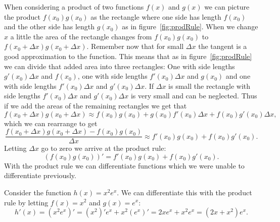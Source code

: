 \documentclass[main.tex]{subfiles}
\begin{document}
When considering a product of two functions $f(x)$ and $g(x)$ we can picture the product $f(x_0) g(x_0)$ as the rectangle where one side has length $f(x_0)$ and the other side has length $g(x_0)$ as in figure~\ref{fig:prodRule}. When we change $x$ a little the area of the rectangle changes from $f(x_0) g(x_0)$ to $f(x_0 + \Delta x) g(x_0 + \Delta x)$. Remember now that for small $\Delta x$ the tangent is a good approximation to the function. This means that as in figure~\ref{fig:prodRule} we can divide that added area into three rectangles: One with side lengths $g'(x_0) \Delta x$ and $f(x_0)$, one with side lengths $f'(x_0) \Delta x$ and $g(x_0)$ and one with side lengths $f'(x_0) \Delta x$ and $g'(x_0) \Delta x$. If $\Delta x$ is small the rectangle with side lengths $f'(x_0) \Delta x$ and $g'(x_0) \Delta x$ is very small and can be neglected. Thus if we add the areas of the remaining rectangles we get that
\begin{equation}
f(x_0 + \Delta x) g(x_0 + \Delta x) \approx f(x_0) g(x_0) + g(x_0) f'(x_0) \Delta x + f(x_0) g'(x_0) \Delta x,
\end{equation}
which we can rearrange to get
\begin{equation}
\frac{f(x_0 + \Delta x) g(x_0 + \Delta x) - f(x_0) g(x_0)}{\Delta x} \approx f'(x_0) g(x_0) + f(x_0) g'(x_0).
\end{equation}
Letting $\Delta x$ go to zero we arrive at the product rule:
\begin{equation}
\left( f(x_0) g(x_0) \right)' = f'(x_0) g(x_0) + f(x_0) g'(x_0).
\end{equation}
With the product rule we can differentiate functions which we were unable to differentiate previously.
\begin{example}
Consider the function $h(x) = x^2 e^x$. We can differentiate this with the product rule by letting $f(x) = x^2$ and $g(x) = e^x$:
\begin{equation}
h'(x) = \left( x^2 e^x \right)' = \left( x^2 \right)' e^x + x^2 \left( e^x \right)' = 2 x e^x + x^2 e^x = \left( 2 x + x^2 \right) e^x.
\end{equation}
\end{example}
\end{document}
